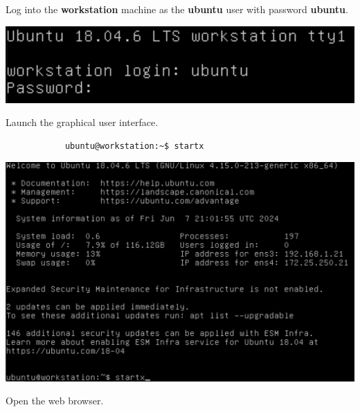 \documentclass[letterpaper, 12pt]{article}
\begin{document}
\begin{enumerate}
    \begin{labstep}
        Log into the \textbf{workstation} machine as the \textbf{ubuntu} user with password \textbf{ubuntu}.

        \begin{center}
            \includegraphics[width=\linewidth]{images/part1/step1.png}
        \end{center}
    \end{labstep}

    \begin{labstep}
        Launch the graphical user interface.

        \begin{lstlisting}
            ubuntu@workstation:~$ startx
        \end{lstlisting}

        \begin{center}
            \includegraphics[width=\linewidth]{images/part1/step2.png}
        \end{center}
    \end{labstep}

    \begin{labstep}
        Open the web browser.


\end{labstep}
\end{enumerate}
\end{document}
